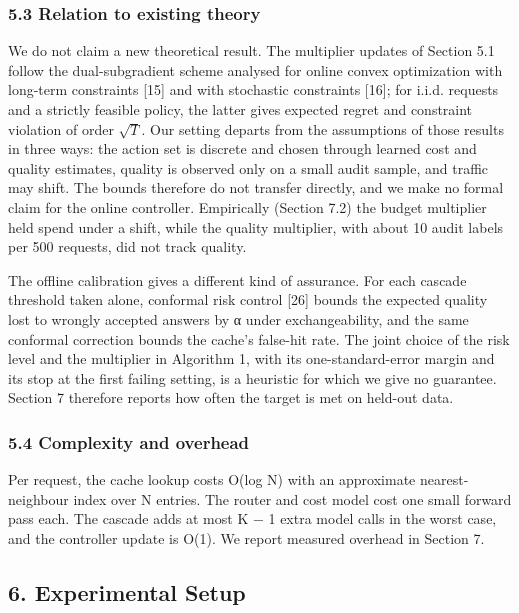 \documentclass[
  10pt,
]{article}
\begin{document}
\subsubsection{5.3 Relation to existing
theory}\label{relation-to-existing-theory}

We do not claim a new theoretical result. The multiplier updates of
Section 5.1 follow the dual-subgradient scheme analysed for online
convex optimization with long-term constraints {[}15{]} and with
stochastic constraints {[}16{]}; for i.i.d. requests and a strictly
feasible policy, the latter gives expected regret and constraint
violation of order \(\sqrt{T}\). Our setting departs from the
assumptions of those results in three ways: the action set is discrete
and chosen through learned cost and quality estimates, quality is
observed only on a small audit sample, and traffic may shift. The bounds
therefore do not transfer directly, and we make no formal claim for the
online controller. Empirically (Section 7.2) the budget multiplier held
spend under a shift, while the quality multiplier, with about 10 audit
labels per 500 requests, did not track quality.

The offline calibration gives a different kind of assurance. For each
cascade threshold taken alone, conformal risk control {[}26{]} bounds
the expected quality lost to wrongly accepted answers by α under
exchangeability, and the same conformal correction bounds the cache's
false-hit rate. The joint choice of the risk level and the multiplier in
Algorithm 1, with its one-standard-error margin and its stop at the
first failing setting, is a heuristic for which we give no guarantee.
Section 7 therefore reports how often the target is met on held-out
data.

\subsubsection{5.4 Complexity and
overhead}\label{complexity-and-overhead}

Per request, the cache lookup costs O(log N) with an approximate
nearest-neighbour index over N entries. The router and cost model cost
one small forward pass each. The cascade adds at most K − 1 extra model
calls in the worst case, and the controller update is O(1). We report
measured overhead in Section 7.

\subsection{6. Experimental Setup}\label{experimental-setup}
\end{document}
